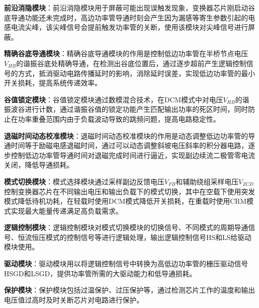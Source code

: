 
\textbf{前沿消隐模块}：前沿消隐模块用于屏蔽可能出现误触发现象，变换器芯片刚启动谷底导通功能还未完成时，高边功率管导通时刻会产生因为漏感等寄生参数引起的电感电流尖峰，该尖峰信号会提前触发功率管的关断，使用该模块对尖峰信号进行屏蔽。

\textbf{精确谷底导通模块}：精确谷底导通模块的作用是控制低边功率管在半桥节点电压$V_{HB}$的谐振谷底处精确导通，在检测出谷底位置后，通过逐步超前产生逻辑控制信号的方式，抵消驱动电路传播延时的影响，消除延时误差，实现低边功率管的最小开关损耗，提高系统传递效率。

\textbf{谷值锁定模块}：谷值锁定模块通过数模混合技术，在DCM模式中对电压$V_{HB}$的谐振波谷进行计数，通过谐振谷值的锁定功能产生匹配输出功率的死区时间，同时防止在功率重叠范围内由于负载波动导致的跳频问题，提高电路稳定性。

\textbf{退磁时间动态校准模块}：退磁时间动态校准模块的作用是动态调整低边功率管的导通时间等于励磁电感退磁时间，通过可以动态调整斜坡电压斜率的积分器电路，逐步控制低边功率管导通时间对退磁完成时间进行逼近，实现副边续流二极管零电流关闭，降低导通损耗。

\textbf{模式切换模块}：模式选择模块通过采样副边反馈电压$V_{FB}$和辅助绕组采样电压$V_{ZCD}$控制变换器芯片在不同输出电压和输出负载下的模式切换，其中在空载下使用突发模式降低待机功耗，在轻载时使用DCM模式降低开关损耗，在重载时使用CRM模式实现最大能量传递满足高负载需求。

\textbf{逻辑控制模块}：逻辑控制模块对模式切换模块的切换信号、不同模式的周期导通信号、恒流恒压模式的控制信号等进行逻辑处理，输出逻辑控制信号HS和LS给驱动模块使用。

\textbf{驱动模块}：驱动模块用以将逻辑控制信号中转换为高低边功率管的栅压驱动信号HSGD和LSGD，提供功率管所需的大驱动能力和低导通损耗。

\textbf{保护模块}：保护模块包括过温保护、过压保护等，通过检测芯片工作的温度和输出电压值过高时及时关断芯片对电路进行保护。



